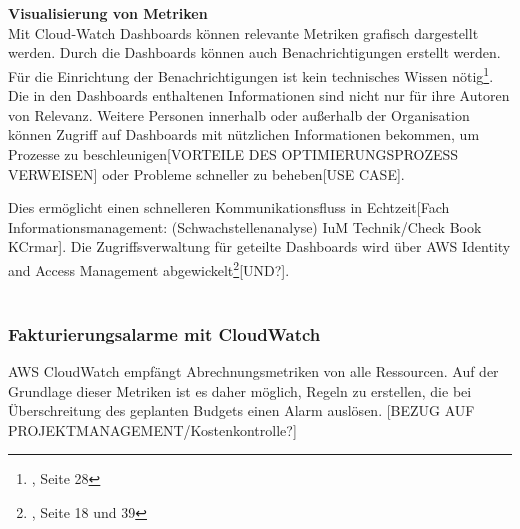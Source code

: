 \\\\
\textbf{Visualisierung von Metriken}\\
Mit Cloud-Watch Dashboards können relevante Metriken grafisch dargestellt werden. %
Durch die Dashboards können auch Benachrichtigungen erstellt werden. Für die Einrichtung der Benachrichtigungen ist kein technisches Wissen nötig\footnote{\cite{AMZ14}, Seite 28}.
Die in den Dashboards enthaltenen Informationen sind nicht nur für ihre Autoren von Relevanz.
Weitere Personen innerhalb oder außerhalb der Organisation können Zugriff auf Dashboards mit nützlichen Informationen bekommen, um Prozesse zu beschleunigen[VORTEILE DES OPTIMIERUNGSPROZESS VERWEISEN] oder Probleme schneller zu beheben[USE CASE].

Dies ermöglicht einen schnelleren Kommunikationsfluss in Echtzeit[Fach Informationsmanagement: (Schwachstellenanalyse) IuM Technik/Check Book KCrmar]. Die Zugriffsverwaltung für geteilte Dashboards wird über AWS Identity and Access Management abgewickelt\footnote{\cite{AMZ14}, Seite 18 und 39}[UND?].
\\\\
\subsubsection*{Fakturierungsalarme mit CloudWatch}
AWS CloudWatch empfängt Abrechnungsmetriken von alle Ressourcen. Auf der Grundlage dieser Metriken ist es daher möglich, Regeln zu erstellen, die bei Überschreitung des geplanten Budgets einen Alarm auslösen.
[BEZUG AUF PROJEKTMANAGEMENT/Kostenkontrolle?]

